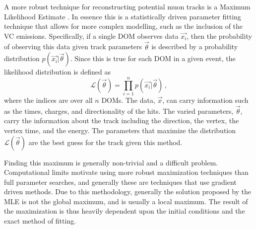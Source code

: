A more robust technique for reconstructing potential muon tracks is a Maximum Likelihood Estimate \cite{llh_text}. In essence this is a statistically driven parameter fitting technique that allows for more complex modelling, such as the inclusion of the VC emissions. Specifically, if a single DOM observes data $\vec{x_{i}}$, then the probability of observing this data given track parameters $\vec{\theta}$ is described by a probability distribution $p\left(\vec{x_{i}}|\vec{\theta}\right)$. Since this is true for each DOM in a given event, the likelihood distribution is defined as
\begin{equation}
  \mathcal{L}(\vec{\theta}) = \prod_{i=1}^{n}p\left(\vec{x_{i}}|\vec{\theta}\right)\, ,
\end{equation}
where the indices are over all $n$ DOMs. The data, $\vec{x}$, can carry information such as the times, charges, and directionality of the hits. The varied parameters, $\vec{\theta}$, carry the information about the track including the direction, the vertex, the vertex time, and the energy. The parameters that maximize the distribution $\mathcal{L}(\vec{\theta})$ are the best guess for the track given this method.

Finding this maximum is generally non-trivial and a difficult problem. Computational limits motivate using more robust maximization techniques than full parameter searches, and generally these are techniques that use gradient driven methods. Due to this methodology, generally the solution proposed by the MLE is not the global maximum, and is usually a local maximum. The result of the maximization is thus heavily dependent upon the initial conditions and the exact method of fitting. 


